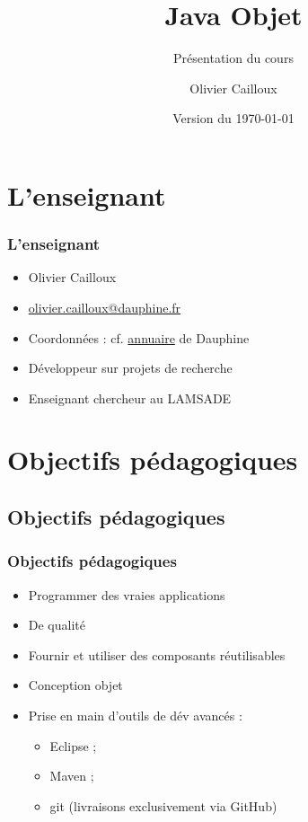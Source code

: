 \documentclass[english, french]{beamer}
\title{Java Objet}
\subtitle{Présentation du cours}
\author{Olivier Cailloux}
\institute[LAMSADE]{LAMSADE, Université Paris-Dauphine}
\date{Version du \today}
\begin{document}


\begin{frame}[plain]
   \titlepage
\end{frame}
\addtocounter{framenumber}{-1}

\section{L’enseignant}
\begin{frame}
	\frametitle{L’enseignant}
	\begin{itemize}
		\item Olivier Cailloux
		\item \href{mailto:olivier.cailloux@dauphine.fr}{olivier.cailloux@dauphine.fr}
		\item Coordonnées : cf. \href{https://www.ent.dauphine.fr/annuaire/index.php?param0=fiche&param1=ocailloux}{annuaire} de Dauphine 
		\item Développeur sur projets de recherche
		\item Enseignant chercheur au LAMSADE
	\end{itemize}
\end{frame}

\section[Obj. pédagogiques]{Objectifs pédagogiques}
\subsection{Objectifs pédagogiques}
\begin{frame}
	\frametitle{Objectifs pédagogiques}
	\begin{itemize}
		\item Programmer des vraies applications
		\item De qualité
		\item Fournir et utiliser des composants réutilisables
		\item Conception objet
		\item Prise en main d’outils de dév avancés : 
		\begin{itemize}
			\item Eclipse ;
			\item Maven ;
			\item git (livraisons exclusivement via GitHub)
		\end{itemize}
	\end{itemize}
\end{frame}
\end{document}
